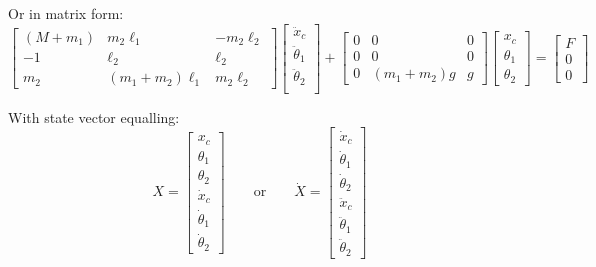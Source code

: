 \documentclass[10pt]{article}
\begin{document}
    Or in matrix form:
    \begin{equation}
        \begin{bmatrix}
            (M+m_1) & m_2\ell_1         & -m_2\ell_2\\
            -1      & \ell_2            &  \ell_2\\
            m_2     & (m_1+m_2)\ell_1   & m_2\ell_2
        \end{bmatrix}
        \begin{bmatrix}
            \ddot x_c\\
            \ddot \theta_1\\
            \ddot \theta_2\\
        \end{bmatrix}
        +
        \begin{bmatrix}
            0&0&0\\
            0&0&0\\
            0&(m_1 +m_2)g& g
        \end{bmatrix}
        \begin{bmatrix}
            x_c\\
            \theta_1\\
            \theta_2
        \end{bmatrix}
        =
        \begin{bmatrix}
            F\\
            0\\
            0
        \end{bmatrix}
    \end{equation}

    With state vector equalling:
    \begin{equation}
        X=
        \begin{bmatrix}
            x_c\\
            \theta_1\\
            \theta_2\\
            \dot x_c\\
            \dot \theta_1\\
            \dot \theta_2
        \end{bmatrix}   
        \qquad\text{or}\qquad\dot X=
        \begin{bmatrix}
            \dot x_c\\
            \dot \theta_1\\
            \dot \theta_2\\
            \ddot x_c\\
            \ddot \theta_1\\
            \ddot \theta_2
        \end{bmatrix}   
    \end{equation}
\end{document}

